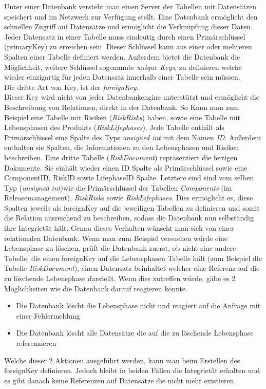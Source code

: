 Unter einer Datenbank versteht man einen Server der Tabellen mit Datensätzen speichert und im Netzwerk zur Verfügung stellt.
Eine Datenbank ermöglicht den schnellen Zugriff auf Datensätze und ermöglicht die Verknüpfung dieser Daten. Jeder Datensatz in einer Tabelle muss eindeutig durch einen Primärschlüssel (primaryKey) zu erreichen sein. Dieser Schlüssel kann aus einer oder mehreren Spalten einer Tabelle definiert werden. Außerdem bietet die Datenbank die Möglichkeit, weitere Schlüssel sogenannte \emph{unique Keys}, zu definieren welche wieder einzigartig für jeden Datensatz innerhalb einer Tabelle sein müssen.\\
Die dritte Art von Key, ist der \emph{foreignKey}.\\
Dieser Key wird nicht von jeder Datenbankengine unterstützt und ermöglicht die Beschreibung von Relationen, direkt in der Datenbank. 
So Kann man zum Beispiel eine Tabelle mit Risiken (\emph{RiskRisks}) haben, sowie eine Tabelle mit Lebensphasen des Produkts (\emph{RiskLifephases}). Jede Tabelle enthält als Primärschlüssel eine Spalte des Typs \emph{unsigned int} mit dem Namen \emph{ID}. Außerdem enthalten sie Spalten, die Informationen zu den Lebensphasen und Risiken beschreiben.
Eine dritte Tabelle (\emph{RiskDocument}) repräsentiert die fertigen Dokumente. Sie einhält wieder einen ID Spalte als Primärschlüssel sowie eine ComponentID, RiskID sowie LifephaseID Spalte. Letztere sind sind vom selben Typ (\emph{unsigned int})wie die Primärschlüssel der Tabellen \emph{Components} (im Releasemanagement), \emph{RiskRisks} sowie \emph{RiskLifephases}. Dies ermöglicht es, diese Spalten jeweils als foreignKey auf die jeweiligen Tabellen zu definieren und somit die Relation ausreichend zu beschreiben, sodass die Datenbank nun selbständig ihre Integrietät hält. Genau dieses Verhalten wünscht man sich von einer relationalen Datenbank.
Wenn man zum Beispiel versuchen würde eine Lebensphase zu löschen, prüft die Datenbank zuerst, ob nicht eine andere Tabelle, die einen foreignKey auf die Lebensphasen Tabelle hält (zum Beispiel die Tabelle \emph{RiskDocument}), einen Datensatz beinhaltet welcher eine Referenz auf die zu löschende Lebensphase darstellt. Wenn dies zutreffen würde, gäbe es 2 Möglichkeiten wie die Datenbank darauf reagieren könnte.
\begin{itemize}
	\item Die Datenbank löscht die Lebensphase nicht und reagiert auf die Anfrage mit einer Fehlermeldung
	\item Die Datenbank löscht alle Datensätze die auf die zu löschende Lebensphase referenzieren
\end{itemize}
Welche dieser 2 Aktionen ausgeführt werden, kann man beim Erstellen des foreignKey definieren. Jedoch bleibt in beiden Fällen die Integrietät erhalten und es gibt danach keine Referenzen auf Datensätze die nicht mehr existieren.
